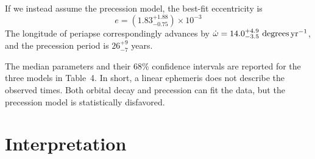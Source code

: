 \documentclass[12pt,twocolumn,tighten]{aastex62}
\begin{document}
If we instead assume the precession model, the best-fit eccentricity
is
\begin{equation}
  e = (1.83^{+ 1.88}_{- 0.75})\times10^{-3}
\end{equation}
The longitude of periapse correspondingly advances by $\dot{\omega} =
14.0^{+4.9}_{-3.5}\ {\rm degrees}\,{\rm yr}^{-1}$, and the precession
period is $26^{+9}_{-7}$ years.

The median parameters and their 68\% confidence intervals are reported
for the three models in Table~4.  In short, a linear ephemeris does
not describe the observed times.  Both orbital decay and precession
can fit the data, but the precession model is statistically
disfavored.


\section{Interpretation}
\label{sec:implications}
\end{document}
